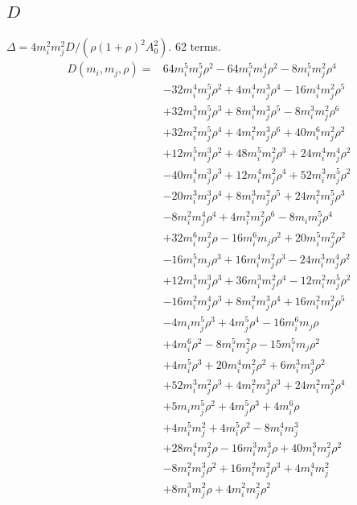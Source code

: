 \subsection*{$D$}
$\Delta=4m_i^2m_j^2D/(\rho(1+\rho)^2A_0^2)$. 62 terms.
{\small
\begin{align*}
D(m_i,m_j,\rho)={}&64m_i^{5}m_j^{5}\rho^{2}-64m_i^{5}m_j^{4}\rho^{2}-8m_i^{5}m_j^{2}\rho^{4}\\
&-32m_i^{4}m_j^{5}\rho^{2}+4m_i^{4}m_j^{3}\rho^{4}-16m_i^{4}m_j^{2}\rho^{5}\\
&+32m_i^{3}m_j^{5}\rho^{3}+8m_i^{3}m_j^{3}\rho^{5}-8m_i^{3}m_j^{2}\rho^{6}\\
&+32m_i^{2}m_j^{5}\rho^{4}+4m_i^{2}m_j^{3}\rho^{6}+40m_i^{6}m_j^{2}\rho^{2}\\
&+12m_i^{5}m_j^{3}\rho^{2}+48m_i^{5}m_j^{2}\rho^{3}+24m_i^{4}m_j^{4}\rho^{2}\\
&-40m_i^{4}m_j^{3}\rho^{3}+12m_i^{4}m_j^{2}\rho^{4}+52m_i^{3}m_j^{5}\rho^{2}\\
&-20m_i^{3}m_j^{3}\rho^{4}+8m_i^{3}m_j^{2}\rho^{5}+24m_i^{2}m_j^{5}\rho^{3}\\
&-8m_i^{2}m_j^{4}\rho^{4}+4m_i^{2}m_j^{2}\rho^{6}-8m_im_j^{5}\rho^{4}\\
&+32m_i^{6}m_j^{2}\rho-16m_i^{6}m_j\rho^{2}+20m_i^{5}m_j^{2}\rho^{2}\\
&-16m_i^{5}m_j\rho^{3}+16m_i^{4}m_j^{2}\rho^{3}-24m_i^{3}m_j^{4}\rho^{2}\\
&+12m_i^{3}m_j^{3}\rho^{3}+36m_i^{3}m_j^{2}\rho^{4}-12m_i^{2}m_j^{5}\rho^{2}\\
&-16m_i^{2}m_j^{4}\rho^{3}+8m_i^{2}m_j^{3}\rho^{4}+16m_i^{2}m_j^{2}\rho^{5}\\
&-4m_im_j^{5}\rho^{3}+4m_j^{5}\rho^{4}-16m_i^{6}m_j\rho\\
&+4m_i^{6}\rho^{2}-8m_i^{5}m_j^{2}\rho-15m_i^{5}m_j\rho^{2}\\
&+4m_i^{5}\rho^{3}+20m_i^{4}m_j^{2}\rho^{2}+6m_i^{3}m_j^{3}\rho^{2}\\
&+52m_i^{3}m_j^{2}\rho^{3}+4m_i^{2}m_j^{3}\rho^{3}+24m_i^{2}m_j^{2}\rho^{4}\\
&+5m_im_j^{5}\rho^{2}+4m_j^{5}\rho^{3}+4m_i^{6}\rho\\
&+4m_i^{5}m_j^{2}+4m_i^{5}\rho^{2}-8m_i^{4}m_j^{3}\\
&+28m_i^{4}m_j^{2}\rho-16m_i^{3}m_j^{3}\rho+40m_i^{3}m_j^{2}\rho^{2}\\
&-8m_i^{2}m_j^{3}\rho^{2}+16m_i^{2}m_j^{2}\rho^{3}+4m_i^{4}m_j^{2}\\
&+8m_i^{3}m_j^{2}\rho+4m_i^{2}m_j^{2}\rho^{2}
\end{align*}
}

